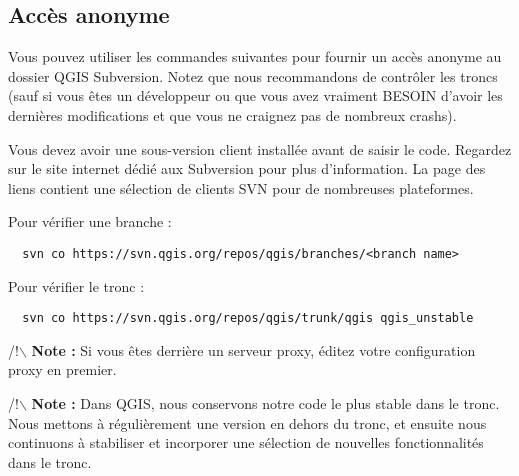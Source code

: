 \subsection{Accès anonyme}

Vous pouvez utiliser les commandes suivantes pour fournir un accès anonyme au dossier QGIS Subversion. Notez que nous recommandons de contrôler les troncs (sauf si vous êtes un développeur ou que vous avez vraiment BESOIN d'avoir les dernières modifications et que vous ne craignez pas de nombreux crashs).

Vous devez avoir une sous-version client installée avant de saisir le code. Regardez sur le site internet dédié aux Subversion pour plus d'information. La page des liens contient une sélection de clients SVN pour de nombreuses plateformes.

Pour vérifier une branche :

\begin{verbatim}
  svn co https://svn.qgis.org/repos/qgis/branches/<branch name>
\end{verbatim}

Pour vérifier le tronc :

\begin{verbatim}
  svn co https://svn.qgis.org/repos/qgis/trunk/qgis qgis_unstable
\end{verbatim}

/!$\backslash$ \textbf{Note :} Si vous êtes derrière un serveur proxy, éditez votre configuration proxy en premier.

/!$\backslash$ \textbf{Note :} Dans QGIS, nous conservons notre code le plus stable dans le tronc. Nous mettons à régulièrement une version en dehors du tronc, et ensuite nous continuons à stabiliser et incorporer une sélection de nouvelles fonctionnalités  dans le tronc.

